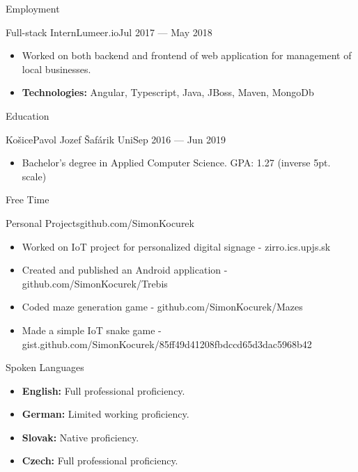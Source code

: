 \documentclass[]{style}
\begin{document}
\begin{cvsection}{Employment}
		\begin{cvsubsection}{Full-stack Intern}{Lumeer.io}{Jul 2017 — May 2018}
			\begin{itemize}
			    \item Worked on both backend and frontend of web application for management of local businesses.
				\item \textbf{Technologies:} Angular, Typescript, Java, JBoss, Maven, MongoDb
			\end{itemize}
		\end{cvsubsection}
	\end{cvsection}
	
	\begin{cvsection}{Education}
		\begin{cvsubsection}{Košice}{Pavol Jozef Šafárik Uni}{Sep 2016 — Jun 2019}
			\begin{itemize}
				\item Bachelor's degree in Applied Computer Science. GPA: 1.27 (inverse 5pt. scale)
			\end{itemize}
		\end{cvsubsection}
	\end{cvsection}
	
	\begin{cvsection}{Free Time}
	    \begin{cvsubsection}{Personal Projects}{}{github.com/SimonKocurek}
			\begin{itemize}
			    \item Worked on IoT project for personalized digital signage - zirro.ics.upjs.sk
			    \item Created and published an Android application - github.com/SimonKocurek/Trebis
			    \item Coded maze generation game - github.com/SimonKocurek/Mazes
			    \item Made a simple IoT snake game - gist.github.com/SimonKocurek/85ff49d41208fbdccd65d3dac5968b42
			\end{itemize}
		\end{cvsubsection}

	\end{cvsection}
	
	\begin{cvsection}{Spoken Languages}
		\begin{cvsubsection}{}{}{}	
			\begin{itemize}
                \item \textbf{English:} Full professional proficiency.
                \item \textbf{German:} Limited working proficiency.
                \item \textbf{Slovak:} Native proficiency.
                \item \textbf{Czech:} Full professional proficiency.
			\end{itemize}
		\end{cvsubsection}
	\end{cvsection}
	
\end{document}
